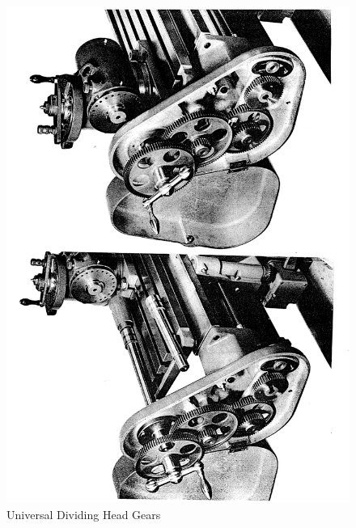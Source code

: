 \newpage
\begin{figure}[h]
    \centering
    \includegraphics[width=1.0\linewidth]{./images/page_50}
    \caption{Universal Dividing Head Gears}
    \label{fig:universal_dividing_head_gears}
\end{figure}
